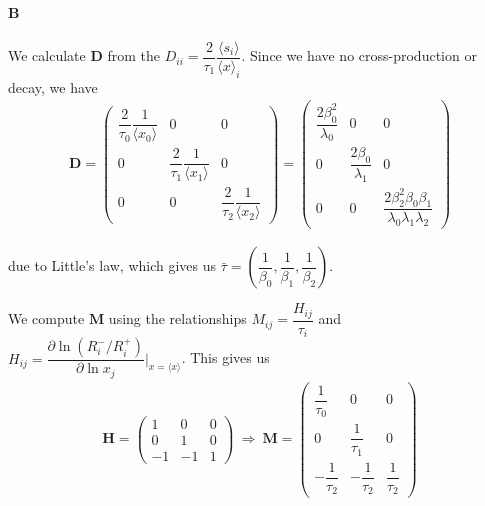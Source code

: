 \documentclass[10pt]{article}\usepackage[]{graphicx}\usepackage[]{color}
\newcommand{\matr}[1]{\mathbf{#1}}
\newcommand{\avg}[1]{\ensuremath{\langle {#1} \rangle}} %
\theoremstyle{plain}
\begin{document}
  \paragraph*{B}
  We calculate $\matr{D}$ from the $D_{ii} =\dfrac{2}{\tau_1} \dfrac{\langle s_i \rangle}{\avg x_i}$. Since we have no cross-production or decay, we have 
  \begin{align*}
  \matr D = 
  \begin{pmatrix}
    \dfrac{2}{\tau_0}\dfrac{1}{\avg{x_0}} & 0 & 0 \\
    0 & \dfrac{2}{\tau_1}\dfrac{1}{\avg {x_1}} & 0 \\
    0 & 0 & \dfrac{2}{\tau_2}\dfrac{1}{\avg {x_2}} 
  \end{pmatrix} = 
  \begin{pmatrix}
    \dfrac{2\beta_0^2}{\lambda_0} & 0 & 0 \\
    0 & \dfrac{2\beta_0}{\lambda_1} & 0 \\
    0 & 0 & \dfrac{2\beta^2_2\beta_0\beta_1}{\lambda_0\lambda_1\lambda_2}
  \end{pmatrix}
  \end{align*}

  due to Little's law, which gives us $\bar\tau = \left( \dfrac{1}{\beta_0}, \dfrac{1}{\beta_1}, \dfrac{1}{\beta_2} \right)$.
  
  We compute $\matr M$ using the relationships $M_{ij} = \dfrac{H_{ij}}{\tau_i}$ and $H_{ij} = \dfrac{\partial \ln \left( R_i^- / R_i^+ \right)}{\partial \ln x_j} \bigg\rvert_{x = \langle x \rangle}$. This gives us
  \begin{align*}
  \matr H = 
  \begin{pmatrix}
   1  & 0 & 0 \\
   0  & 1 & 0 \\
   -1 & -1 & 1
  \end{pmatrix} \ \Rightarrow \
  \matr M = 
  \begin{pmatrix}
    \dfrac{1}{\tau_0} & 0 & 0 \\
   0  & \dfrac{1}{\tau_1}  & 0 \\
   -\dfrac{1}{\tau_2}  & -\dfrac{1}{\tau_2}  & \dfrac{1}{\tau_2} 
  \end{pmatrix}
  \end{align*}

    
\end{document}
